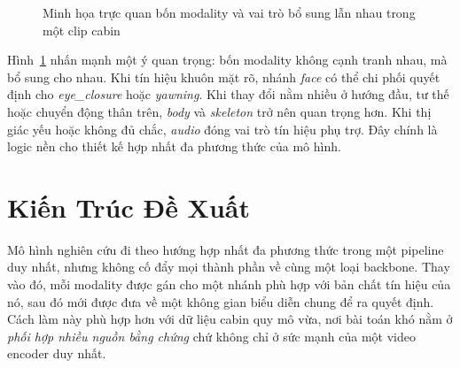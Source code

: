 \documentclass[conference,a4paper]{IEEEtran}
\begin{document}
\begin{figure}[t]
\caption{Minh họa trực quan bốn modality và vai trò bổ sung lẫn nhau trong một clip cabin}
\label{fig:modalities-overview}
\centering
{}
\end{figure}

Hình~\ref{fig:modalities-overview} nhấn mạnh một ý quan trọng: bốn modality không cạnh tranh nhau, mà bổ sung cho nhau. Khi tín hiệu khuôn mặt rõ, nhánh \textit{face} có thể chi phối quyết định cho \textit{eye\_closure} hoặc \textit{yawning}. Khi thay đổi nằm nhiều ở hướng đầu, tư thế hoặc chuyển động thân trên, \textit{body} và \textit{skeleton} trở nên quan trọng hơn. Khi thị giác yếu hoặc không đủ chắc, \textit{audio} đóng vai trò tín hiệu phụ trợ. Đây chính là logic nền cho thiết kế hợp nhất đa phương thức của mô hình.

\section[Kien Truc De Xuat]{Kiến Trúc Đề Xuất}
Mô hình nghiên cứu đi theo hướng hợp nhất đa phương thức trong một pipeline duy nhất, nhưng không cố đẩy mọi thành phần về cùng một loại backbone. Thay vào đó, mỗi modality được gán cho một nhánh phù hợp với bản chất tín hiệu của nó, sau đó mới được đưa về một không gian biểu diễn chung để ra quyết định. Cách làm này phù hợp hơn với dữ liệu cabin quy mô vừa, nơi bài toán khó nằm ở \textit{phối hợp nhiều nguồn bằng chứng} chứ không chỉ ở sức mạnh của một video encoder duy nhất.
\end{document}

